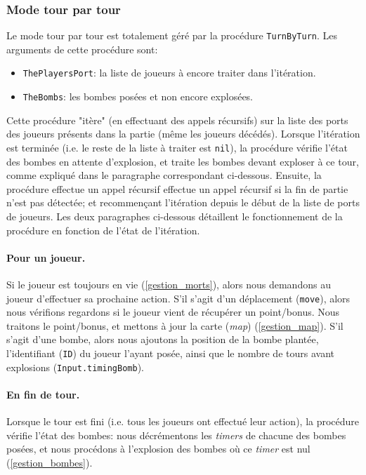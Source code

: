 \documentclass{article}
\begin{document}
\subsubsection{Mode tour par tour}
Le mode tour par tour est totalement géré par la procédure \texttt{TurnByTurn}. Les arguments de cette procédure sont:
\begin{itemize}
	\item \texttt{ThePlayersPort}: la liste de joueurs à encore traiter dans l'itération.
	\item \texttt{TheBombs}: les bombes posées et non encore explosées.
\end{itemize}
 Cette procédure "itère" (en effectuant des appels récursifs) sur la liste des ports des joueurs présents dans la partie (même les joueurs décédés). Lorsque l'itération est terminée (i.e. le reste de la liste à traiter est \texttt{nil}), la procédure vérifie l'état des bombes en attente d'explosion, et traite les bombes devant exploser à ce tour, comme expliqué dans le paragraphe correspondant ci-dessous. Ensuite, la procédure effectue un appel récursif effectue un appel récursif si la fin de partie n'est pas détectée; et recommençant l'itération depuis le début de la liste de ports de joueurs. Les deux paragraphes ci-dessous détaillent le fonctionnement de la procédure en fonction de l'état de l'itération.

\paragraph{Pour un joueur.}Si le joueur est toujours en vie (\ref{gestion_morts}), alors nous demandons au joueur d'effectuer sa prochaine action. S'il s'agit d'un déplacement (\texttt{move}), alors nous vérifions regardons si le joueur vient de récupérer un point/bonus. Nous traitons le point/bonus, et mettons à jour la carte (\emph{map}) (\ref{gestion_map}). S'il s'agit d'une bombe, alors nous ajoutons la position de la bombe plantée, l'identifiant (\texttt{ID}) du joueur l'ayant posée, ainsi que le nombre de tours avant explosions (\texttt{Input.timingBomb}).

\paragraph{En fin de tour.}Lorsque le tour est fini (i.e. tous les joueurs ont effectué leur action), la procédure vérifie l'état des bombes: nous décrémentons les \emph{timers} de chacune des bombes posées, et nous procédons à l'explosion des bombes où ce \emph{timer} est nul (\ref{gestion_bombes}).
\end{document}
